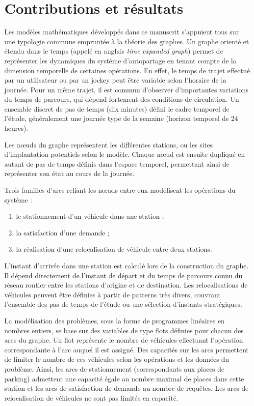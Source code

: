 \section*{Contributions et résultats}
Les modèles mathématiques développés dans ce manuscrit s'appuient tous sur une typologie commune empruntée à la théorie des graphes.
Un graphe orienté et étendu dans le temps (appelé en anglais \emph{time expanded graph}) permet de représenter les dynamiques du système d'autopartage en tenant compte de la dimension temporelle de certaines opérations.
En effet, le temps de trajet effectué par un utilisateur ou par un jockey peut être variable selon l'horaire de la journée.
Pour un même trajet, il est commun d'observer d'importantes variations du temps de parcours, qui dépend fortement des conditions de circulation.
Un ensemble discret de pas de temps (\eg dix minutes) défini le cadre temporel de l'étude, généralement une journée type de la semaine (horizon temporel de $24$ heures).

\medskip
Les nœuds du graphe représentent les différentes stations, ou les sites d'implantation potentiels selon le modèle.
Chaque nœud est ensuite dupliqué en autant de pas de temps définis dans l'espace temporel, permettant ainsi de représenter son état au cours de la journée.

Trois familles d'arcs reliant les nœuds entre eux modélisent les opérations du système :
\begin{enumerate}
\item le stationnement d'un véhicule dans une station ;
\item la satisfaction d'une demande ;
\item la réalisation d'une relocalisation de véhicule entre deux stations.
\end{enumerate}

\medskip
L'instant d'arrivée dans une station est calculé lors de la construction du graphe.
Il dépend directement de l'instant de départ et du temps de parcours connu du réseau routier entre les stations d'origine et de destination.
Les relocalisations de véhicules peuvent être définies à partir de patterns très divers, couvrant l'ensemble des pas de temps de l'étude ou une sélection d'instants stratégiques.

\medskip
La modélisation des problèmes, sous la forme de programmes linéaires en nombres entiers, se base sur des variables de type flots définies pour chacun des arcs du graphe.
Un flot représente le nombre de véhicules effectuant l'opération correspondante à l'arc auquel il est assigné.
Des capacités sur les arcs permettent de limiter le nombre de ces véhicules selon les opérations et les données du problème.
Ainsi, les arcs de stationnement (correspondants aux places de parking) admettent une capacité égale au nombre maximal de places  dans cette station et les arcs de satisfaction de demande au nombre de requêtes.
Les arcs de relocalisation de véhicules ne sont pas limités en capacité.


